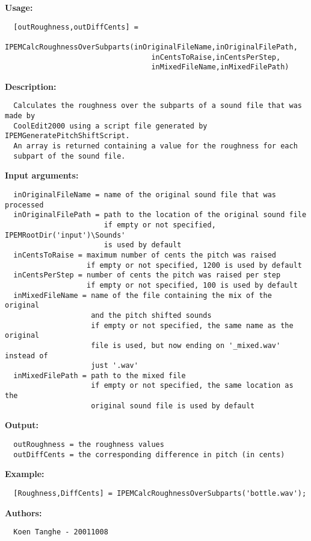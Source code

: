 \textbf{Usage:}
\begin{verbatim}  [outRoughness,outDiffCents] = 
    IPEMCalcRoughnessOverSubparts(inOriginalFileName,inOriginalFilePath,
                                  inCentsToRaise,inCentsPerStep,
                                  inMixedFileName,inMixedFilePath)

\end{verbatim}
\textbf{Description:}
\begin{verbatim}  Calculates the roughness over the subparts of a sound file that was made by
  CoolEdit2000 using a script file generated by IPEMGeneratePitchShiftScript.
  An array is returned containing a value for the roughness for each
  subpart of the sound file.

\end{verbatim}
\textbf{Input arguments:}
\begin{verbatim}  inOriginalFileName = name of the original sound file that was processed
  inOriginalFilePath = path to the location of the original sound file
                       if empty or not specified, IPEMRootDir('input')\Sounds'
                       is used by default
  inCentsToRaise = maximum number of cents the pitch was raised
                   if empty or not specified, 1200 is used by default
  inCentsPerStep = number of cents the pitch was raised per step
                   if empty or not specified, 100 is used by default
  inMixedFileName = name of the file containing the mix of the original 
                    and the pitch shifted sounds
                    if empty or not specified, the same name as the original
                    file is used, but now ending on '_mixed.wav' instead of
                    just '.wav'
  inMixedFilePath = path to the mixed file
                    if empty or not specified, the same location as the
                    original sound file is used by default

\end{verbatim}
\textbf{Output:}
\begin{verbatim}  outRoughness = the roughness values
  outDiffCents = the corresponding difference in pitch (in cents)

\end{verbatim}
\textbf{Example:}
\begin{verbatim}  [Roughness,DiffCents] = IPEMCalcRoughnessOverSubparts('bottle.wav');

\end{verbatim}
\textbf{Authors:}
\begin{verbatim}  Koen Tanghe - 20011008
\end{verbatim}


